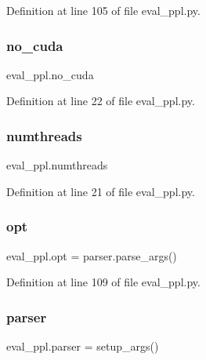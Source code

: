 Definition at line 105 of file eval\+\_\+ppl.\+py.

\mbox{\label{namespaceeval__ppl_a29e51b395613b8f34d6f3309999cbd17}} 
\subsubsection{\texorpdfstring{no\+\_\+cuda}{no\_cuda}}
{\footnotesize\ttfamily eval\+\_\+ppl.\+no\+\_\+cuda}



Definition at line 22 of file eval\+\_\+ppl.\+py.

\mbox{\label{namespaceeval__ppl_ae04f7bc4679953c457925e380d033458}} 
\subsubsection{\texorpdfstring{numthreads}{numthreads}}
{\footnotesize\ttfamily eval\+\_\+ppl.\+numthreads}



Definition at line 21 of file eval\+\_\+ppl.\+py.

\mbox{\label{namespaceeval__ppl_ad8220e41552c5d1888d4005bb713e489}} 
\subsubsection{\texorpdfstring{opt}{opt}}
{\footnotesize\ttfamily eval\+\_\+ppl.\+opt = parser.\+parse\+\_\+args()}



Definition at line 109 of file eval\+\_\+ppl.\+py.

\mbox{\label{namespaceeval__ppl_ac90caa8cd53fac99fa41f5349a41e6d3}} 
\subsubsection{\texorpdfstring{parser}{parser}}
{\footnotesize\ttfamily eval\+\_\+ppl.\+parser = setup\+\_\+args()}



